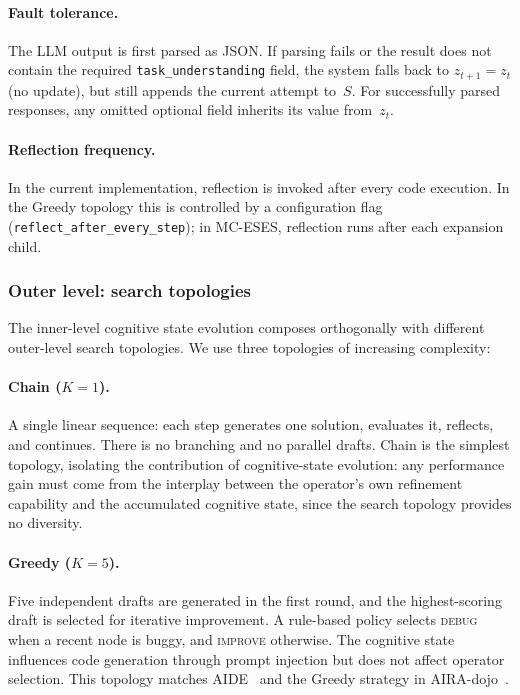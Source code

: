 \documentclass{article} %
\newcommand{\zt}{z_t}
\newcommand{\ztnext}{z_{t+1}}
\begin{document}
\paragraph{Fault tolerance.}
The LLM output is first parsed as JSON. If parsing fails or the result does not
contain the required \texttt{task\_understanding} field, the system falls back
to $\ztnext = \zt$ (no update), but still appends the current attempt to~$S$.
For successfully parsed responses, any omitted optional field inherits its
value from~$\zt$.

\paragraph{Reflection frequency.}
In the current implementation, reflection is invoked after every code
execution. In the Greedy topology this is controlled by a configuration flag
(\texttt{reflect\_after\_every\_step}); in MC-ESES, reflection runs after each
expansion child.


\subsubsection{Outer level: search topologies}
\label{sec:outer}

The inner-level cognitive state evolution composes orthogonally with different
outer-level search topologies. We use three topologies of increasing
complexity:

\paragraph{Chain ($K{=}1$).}
A single linear sequence: each step generates one solution, evaluates it,
reflects, and continues. There is no branching and no parallel drafts.
Chain is the simplest topology, isolating the contribution of cognitive-state
evolution: any performance gain must come from the interplay between the
operator's own refinement capability and the accumulated cognitive state, since
the search topology provides no diversity.

\paragraph{Greedy ($K{=}5$).}
Five independent drafts are generated in the first round, and the
highest-scoring draft is selected for iterative improvement. A rule-based
policy selects \textsc{debug} when a recent node is buggy, and
\textsc{improve} otherwise. The cognitive state influences code generation
through prompt injection but does not affect operator selection. This
topology matches AIDE~\citep{jiang2025aide} and the Greedy strategy in
AIRA-dojo~\citep{airadojo2025}.
\end{document}
